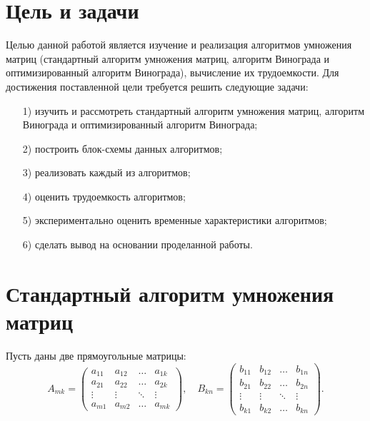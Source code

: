 \documentclass[a4paper,14pt, unknownkeysallowed]{extreport}
\begin{document}
\section{Цель и задачи}
	
Целью данной работой является изучение и реализация алгоритмов умножения матриц (стандартный алгоритм умножения матриц, алгоритм Винограда и оптимизированный алгоритм Винограда), вычисление их трудоемкости. Для достижения поставленной цели требуется решить следующие задачи:
	
\begin{enumerate}
	\item[1)] изучить и рассмотреть стандартный алгоритм умножения матриц, алгоритм Винограда и оптимизированный алгоритм Винограда; 
	\item[2)] построить блок-схемы данных алгоритмов;
	\item[3)] реализовать каждый из алгоритмов;
	\item[4)] оценить трудоемкость алгоритмов;
	\item[5)] экспериментально оценить временные характеристики алгоритмов;
	\item[6)] сделать вывод на основании проделанной работы.
\end{enumerate}

\section{Стандартный алгоритм умножения матриц}

Пусть даны две прямоугольные матрицы:
\begin{equation}
	A_{mk} = \begin{pmatrix}
		a_{11} & a_{12} & \ldots & a_{1k}\\
		a_{21} & a_{22} & \ldots & a_{2k}\\
		\vdots & \vdots & \ddots & \vdots\\
		a_{m1} & a_{m2} & \ldots & a_{mk}
	\end{pmatrix},
	\quad
	B_{kn} = \begin{pmatrix}
		b_{11} & b_{12} & \ldots & b_{1n}\\
		b_{21} & b_{22} & \ldots & b_{2n}\\
		\vdots & \vdots & \ddots & \vdots\\
		b_{k1} & b_{k2} & \ldots & b_{kn}
	\end{pmatrix}.
\end{equation}

\clearpage
\end{document}
